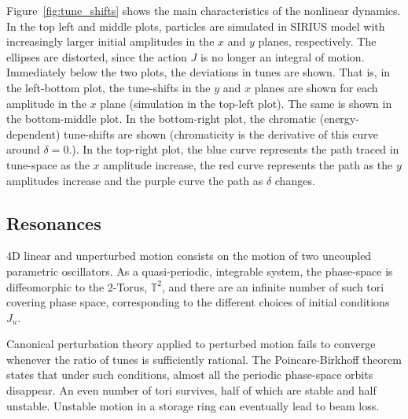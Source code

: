 Figure~\ref{fig:tune_shifts} shows the main characteristics of the nonlinear dynamics. In the top left and middle plots, particles are simulated in SIRIUS model with increasingly larger initial amplitudes in the $x$ and $y$ planes, respectively. The ellipses are distorted, since the action $J$ is no longer an integral of motion. Immediately below the two plots, the deviations in tunes are shown. That is, in the left-bottom plot, the tune-shifts in the $y$ and $x$ planes are shown for each amplitude in the $x$ plane (simulation in the top-left plot). The same is shown in the bottom-middle plot. In the bottom-right plot, the chromatic (energy-dependent) tune-shifts are shown (chromaticity is the derivative of this curve around $\delta=0$.). In the top-right plot, the blue curve represents the path traced in tune-space as the $x$ amplitude increase, the red curve represents the path as the $y$ amplitudes increase and the purple curve the path as $\delta$ changes.
\subsection{Resonances}
4D linear and unperturbed motion consists on the motion of two uncoupled parametric oscillators. As a quasi-periodic, integrable system, the phase-space is diffeomorphic to the 2-Torus, $\mathbb{T}^2$, and there are an infinite number of such tori covering phase space, corresponding to the different choices of initial conditions $J_u$.

Canonical perturbation theory applied to perturbed motion fails to converge whenever the ratio of tunes is sufficiently rational. The Poincare-Birkhoff theorem states that under such conditions, almost all the periodic phase-space orbits disappear. An even number of tori survives, half of which are stable and half unstable. Unstable motion in a storage ring can eventually lead to beam loss.

